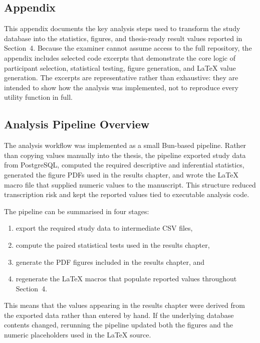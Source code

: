 \begin{appendices}

\section{Appendix}

This appendix documents the key analysis steps used to transform the study database into the statistics, figures, and thesis-ready result values reported in Section~4. Because the examiner cannot assume access to the full repository, the appendix includes selected code excerpts that demonstrate the core logic of participant selection, statistical testing, figure generation, and LaTeX value generation. The excerpts are representative rather than exhaustive: they are intended to show how the analysis was implemented, not to reproduce every utility function in full.

\subsection{Analysis Pipeline Overview}

The analysis workflow was implemented as a small Bun-based pipeline. Rather than copying values manually into the thesis, the pipeline exported study data from PostgreSQL, computed the required descriptive and inferential statistics, generated the figure PDFs used in the results chapter, and wrote the LaTeX macro file that supplied numeric values to the manuscript. This structure reduced transcription risk and kept the reported values tied to executable analysis code.

The pipeline can be summarised in four stages:

\begin{enumerate}
    \item export the required study data to intermediate CSV files,
    \item compute the paired statistical tests used in the results chapter,
    \item generate the PDF figures included in the results chapter, and
    \item regenerate the LaTeX macros that populate reported values throughout Section~4.
\end{enumerate}

This means that the values appearing in the results chapter were derived from the exported data rather than entered by hand. If the underlying database contents changed, rerunning the pipeline updated both the figures and the numeric placeholders used in the LaTeX source.


\end{appendices}

